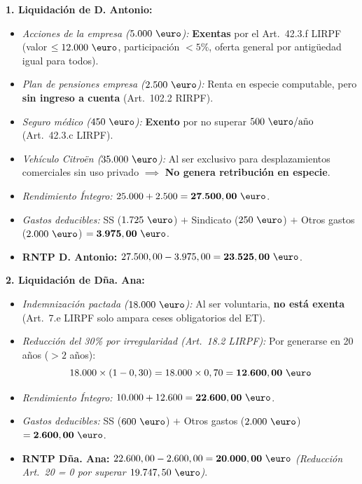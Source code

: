 \documentclass[11pt,a4paper,openany]{article}
\begin{document}
\begin{solucionBox}
\textbf{1. Liquidación de D. Antonio:}
\begin{itemize}
    \item \textit{Acciones de la empresa ($5.000\text{ \euro}$):} \textbf{Exentas} por el Art.~42.3.f LIRPF (valor $\le 12.000\text{ \euro}$, participación $<5\%$, oferta general por antigüedad igual para todos).
    \item \textit{Plan de pensiones empresa ($2.500\text{ \euro}$):} Renta en especie computable, pero \textbf{sin ingreso a cuenta} (Art.~102.2 RIRPF).
    \item \textit{Seguro médico ($450\text{ \euro}$):} \textbf{Exento} por no superar $500\text{ \euro/año}$ (Art.~42.3.c LIRPF).
    \item \textit{Vehículo Citroën ($35.000\text{ \euro}$):} Al ser exclusivo para desplazamientos comerciales sin uso privado $\implies$ \textbf{No genera retribución en especie}.
    \item \textit{Rendimiento Íntegro:} $25.000 + 2.500 = \mathbf{27.500,00\text{ \euro}}$.
    \item \textit{Gastos deducibles:} SS ($1.725\text{ \euro}$) $+$ Sindicato ($250\text{ \euro}$) $+$ Otros gastos ($2.000\text{ \euro}$) $= \mathbf{3.975,00\text{ \euro}}$.
    \item \textbf{RNTP D. Antonio:} $27.500,00 - 3.975,00 = \mathbf{23.525,00\text{ \euro}}$.
\end{itemize}

\textbf{2. Liquidación de Dña. Ana:}
\begin{itemize}
    \item \textit{Indemnización pactada ($18.000\text{ \euro}$):} Al ser voluntaria, \textbf{no está exenta} (Art.~7.e LIRPF solo ampara ceses obligatorios del ET).
    \item \textit{Reducción del 30\% por irregularidad (Art.~18.2 LIRPF):} Por generarse en 20 años ($>2$ años):
    $$18.000 \times (1 - 0,30) = 18.000 \times 0,70 = \mathbf{12.600,00\text{ \euro}}$$
    \item \textit{Rendimiento Íntegro:} $10.000 + 12.600 = \mathbf{22.600,00\text{ \euro}}$.
    \item \textit{Gastos deducibles:} SS ($600\text{ \euro}$) $+$ Otros gastos ($2.000\text{ \euro}$) $= \mathbf{2.600,00\text{ \euro}}$.
    \item \textbf{RNTP Dña. Ana:} $22.600,00 - 2.600,00 = \mathbf{20.000,00\text{ \euro}}$ \textit{(Reducción Art.~20 = 0 por superar $19.747,50\text{ \euro}$)}.
\end{itemize}
\end{solucionBox}
\end{document}
